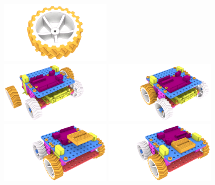 \documentclass[twoside,a5paper,8pt]{article}
\begin{document}
  \includegraphics[height=30mm]{blender-render/render-instr/19-wheel-and-tyre-view2.png} \\
  \includegraphics[height=30mm]{blender-render/render-instr/20-frame-block3-dev-view1.png}
  \includegraphics[height=30mm]{blender-render/render-instr/21-frame-block3-view1.png} \\
  \includegraphics[height=30mm]{blender-render/render-instr/22-frame-block4-dev.png}
  \includegraphics[height=30mm]{blender-render/render-instr/23-frame-block4.png} \\
  
\end{document}
